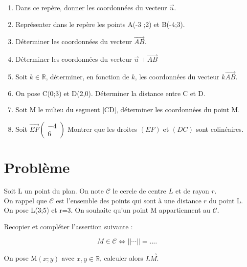 \documentclass[french]{book}
\begin{document}
\begin{enumerate}

\item Dans ce repère, donner les coordonnées du vecteur $\overrightarrow{u}$.

\item Représenter dans le repère les points A(-3 ;2) et B(-4;3).

\item Déterminer les coordonnées  du vecteur $\overrightarrow{AB}$.

\item Déterminer les coordonnées du vecteur $\overrightarrow{u} + \overrightarrow{AB} $

\item Soit $k \in \mathbb{R}$, déterminer, en fonction de $k$, les coordonnées du vecteur $k\overrightarrow{AB}$. 

\item On pose C(0;3) et D(2,0). Déterminer la distance entre C et D.

\item Soit M le milieu du segment [CD], déterminer les coordonnées du point M.   

\item Soit $\overrightarrow{EF} \left( \begin{array}{c}
-4 \\
6 
\end{array} \right)$
 Montrer que les droites $(EF)$ et $(DC)$ sont colinéaires.

\end{enumerate}

\section*{Problème}

Soit L un point du plan. On note $\mathcal{C}$ le cercle de centre $L$ et de rayon $r$.\\

On rappel que $\mathcal{C}$ est l’ensemble des points qui sont à une distance $r$ du point L. \\

On pose L(3;5) et r=3. On souhaite qu’un point M appartiennent au $\mathcal{C}$. 

Recopier et compléter l’assertion suivante :

$$ M \in \mathcal{C} \Longleftrightarrow \vert \vert  \cdots \vert \vert =  .... $$

On pose M$(x;y)$ avec $x,y \in \mathbb{R}$, calculer alors $\overrightarrow{LM}$.
\end{document}
